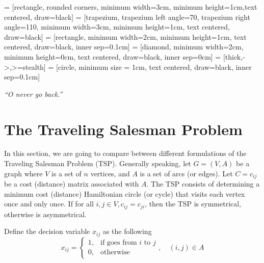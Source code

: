 
\usepackage{makecell}

\usetikzlibrary{shapes.geometric, arrows}
     = [rectangle, rounded corners, minimum width=3cm, minimum height=1cm,text centered, draw=black]
     = [trapezium, trapezium left angle=70, trapezium right angle=110, minimum width=3cm, minimum height=1cm, text centered, draw=black]
     = [rectangle, minimum width=2cm, minimum height=1cm, text centered, draw=black, inner sep=0.1cm]
     = [diamond, minimum width=2cm, minimum height=0cm, text centered, draw=black, inner sep=0cm]
     = [thick,->,>=stealth]
     = [circle, minimum size = 1cm, text centered, draw=black, inner sep=0.1cm]

\renewcommand{\docTitle}{Lecture Note - Traveling Salesman Problem and The Held-Karp Lower Bound}
\renewcommand{\docAuthor}{Lan Peng, Ph.D.}
\renewcommand{\docAffil}{School of Management, Shanghai University, Shanghai, China}

    \titleSec

    \begin{center}
        \textit{``O never go back.''}
    \end{center}

    \section{The Traveling Salesman Problem}
        In this section, we are going to compare between different formulations of the Traveling Salesman Problem (TSP). Generally speaking, let $G = (V, A)$ be a graph where $V$ is a set of $n$ vertices, and $A$ is a set of arcs (or edges). Let $C = c_{ij}$ be a cost (distance) matrix associated with $A$. The TSP consists of determining a minimum cost (distance) Hamiltonian circle (or cycle) that visits each vertex once and only once. If for all $i, j \in V, c_{ij} = c_{ji}$, then the TSP is symmetrical, otherwise is asymmetrical.

        Define the decision variable $x_{ij}$ as the following
        \begin{equation}
            x_{ij} = \begin{cases}
                1, &\text{if goes from } i \text{ to } j\\ 
                0, & \text{otherwise}
            \end{cases}, \quad (i, j) \in A
        \end{equation}

